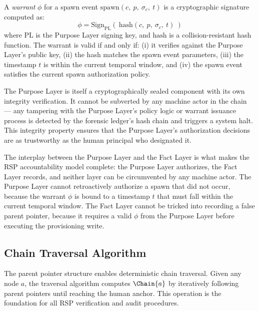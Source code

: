 \begin{dfn}
\label{dfn:purpose-warrant}
A \emph{warrant} $\phi$ for a spawn event $\mathrm{spawn}(c,\ p,\ \sigma_c,\ t)$ is a cryptographic signature computed as:
\begin{equation}
\phi = \text{Sign}_{\text{PL}}(\ \text{hash}(c,\ p,\ \sigma_c,\ t)\ )
\label{eq:warrant-def}
\end{equation}
where $\text{PL}$ is the Purpose Layer signing key, and $\text{hash}$ is a collision-resistant hash function. The warrant is valid if and only if: (i) it verifies against the Purpose Layer's public key, (ii) the hash matches the spawn event parameters, (iii) the timestamp $t$ is within the current temporal window, and (iv) the spawn event satisfies the current spawn authorization policy.
\end{dfn}

The Purpose Layer is itself a cryptographically sealed component with its own integrity verification. It cannot be subverted by any machine actor in the chain — any tampering with the Purpose Layer's policy logic or warrant issuance process is detected by the forensic ledger's hash chain and triggers a system halt. This integrity property ensures that the Purpose Layer's authorization decisions are as trustworthy as the human principal who designated it.

The interplay between the Purpose Layer and the Fact Layer is what makes the RSP accountability model complete: the Purpose Layer authorizes, the Fact Layer records, and neither layer can be circumvented by any machine actor. The Purpose Layer cannot retroactively authorize a spawn that did not occur, because the warrant $\phi$ is bound to a timestamp $t$ that must fall within the current temporal window. The Fact Layer cannot be tricked into recording a false parent pointer, because it requires a valid $\phi$ from the Purpose Layer before executing the provisioning write.

\subsection{Chain Traversal Algorithm}
\label{sec:chain-traversal}

The parent pointer structure enables deterministic chain traversal. Given any node $a$, the traversal algorithm computes $\Chain{a}$ by iteratively following parent pointers until reaching the human anchor. This operation is the foundation for all RSP verification and audit procedures.

